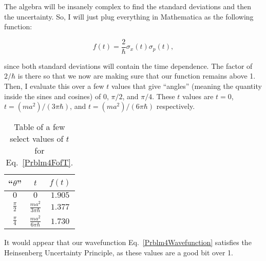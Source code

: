 The algebra will be insanely complex to find the standard deviations and then the uncertainty. So, I will just plug everything in Mathematica as the following function:

\begin{equation}
    f(t) = \frac{2}{\hbar}\sigma_x(t)\sigma_p(t),\label{Prblm4FofT}
\end{equation}

since both standard deviations will contain the time dependence. The factor of $2/\hbar$ is there so that we now are making sure that our function remains above 1. Then, I evaluate this over a few $t$ values that give ``angles'' (meaning the quantity inside the sines and cosines) of $0$, $\pi/2$, and $\pi/4$. These $t$ values are $t=0$, $t=(ma^2)/(3\pi\hbar)$, and $t=(ma^2)/(6\pi\hbar)$ respectively.

\renewcommand{\arraystretch}{1.25}
\begin{table}[ht]
    \centering
    \begin{tabular}{c|c|c}
        ``$\theta$'' & $t$ & $f(t)$ \\ \hline
        $0$ & $0$ & $1.905$ \\
        $\frac{\pi}{2}$ & $\frac{ma^2}{3\pi\hbar}$ & $1.377$ \\
        $\frac{\pi}{4}$ & $\frac{ma^2}{6\pi\hbar}$ & $1.730$ \\
    \end{tabular}
    \caption{Table of a few select values of $t$ for Eq.~\eqref{Prblm4FofT}.}
    \label{Prblm4Table}
\end{table}
\renewcommand{\arraystretch}{1}

It would appear that our wavefunction Eq.~\eqref{Prblm4Wavefunction} satisfies the Heinsenberg Uncertainty Principle, as these values are a good bit over 1.